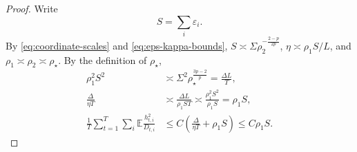 \documentclass[11pt,letterpaper]{article}
\theoremstyle{definition}
\newcommand{\E}{\mathbb E}
\newcommand{\eps}{\varepsilon}
\begin{document}
\begin{proof}
Write
\[
S=\sum_i\eps_i.
\]
By \eqref{eq:coordinate-scales} and \eqref{eq:eps-kappa-bounds},
$S\asymp\Sigma\rho_2^{-\frac{2-p}{2p}}$,
$\eta\asymp\rho_1S/L$, and $\rho_1\asymp\rho_2\asymp\rho_\star$.
By the definition of $\rho_\star$,
\begin{equation}
\begin{aligned}
\rho_1^2S^2
&\asymp\Sigma^2\rho_\star^{\frac{3p-2}{p}}
=\frac{\Delta L}{T},\\
\frac{\Delta}{\eta T}
&\asymp\frac{\Delta L}{\rho_1ST}
\asymp\frac{\rho_1^2S^2}{\rho_1S}=\rho_1S,\\
\frac1T\sum_{t=1}^T\sum_i\E\frac{h_{t,i}^2}{D_{t,i}}
&\le C\left(\frac{\Delta}{\eta T}+\rho_1S\right)
\le C\rho_1S.
\end{aligned}
\label{eq:tuned-descent}
\end{equation}


\end{proof}
\end{document}
